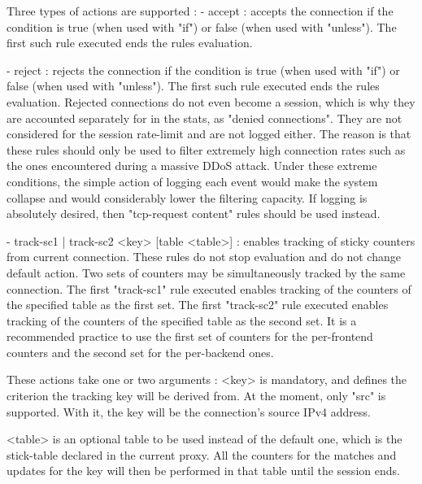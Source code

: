 \begin{description}
\begin{itemize}
  Three types of actions are supported :
    - accept :
        accepts the connection if the condition is true (when used with "if")
        or false (when used with "unless"). The first such rule executed ends
        the rules evaluation.

    - reject :
        rejects the connection if the condition is true (when used with "if")
        or false (when used with "unless"). The first such rule executed ends
        the rules evaluation. Rejected connections do not even become a
        session, which is why they are accounted separately for in the stats,
        as "denied connections". They are not considered for the session
        rate-limit and are not logged either. The reason is that these rules
        should only be used to filter extremely high connection rates such as
        the ones encountered during a massive DDoS attack. Under these extreme
        conditions, the simple action of logging each event would make the
        system collapse and would considerably lower the filtering capacity. If
        logging is absolutely desired, then "tcp-request content" rules should
        be used instead.

    - { track-sc1 | track-sc2 } <key> [table <table>] :
        enables tracking of sticky counters from current connection. These
        rules do not stop evaluation and do not change default action. Two sets
        of counters may be simultaneously tracked by the same connection. The
        first "track-sc1" rule executed enables tracking of the counters of the
        specified table as the first set. The first "track-sc2" rule executed
        enables tracking of the counters of the specified table as the second
        set. It is a recommended practice to use the first set of counters for
        the per-frontend counters and the second set for the per-backend ones.

        These actions take one or two arguments :
          <key>   is mandatory, and defines the criterion the tracking key will
                  be derived from. At the moment, only "src" is supported. With
                  it, the key will be the connection's source IPv4 address.

         <table>  is an optional table to be used instead of the default one,
                  which is the stick-table declared in the current proxy. All
                  the counters for the matches and updates for the key will
                  then be performed in that table until the session ends.


\end{itemize}
\end{description}
